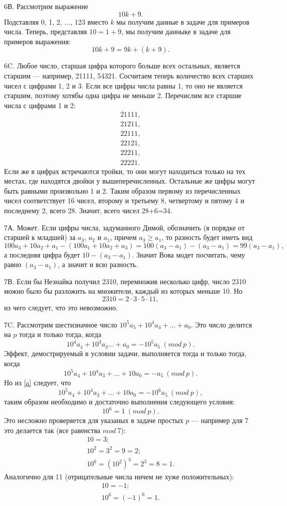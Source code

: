 \documentclass[12pt]{amsart}
\theoremstyle{definition}
\theoremstyle{remark}
\theoremstyle{plain}
\begin{document}
6В. Рассмотрим выражение
$$
10k+9.
$$
Подставляя 0, 1, 2, ..., 123 вместо $k$ мы получим данные в задаче для примеров числа. Теперь, представляя $10=1+9$, мы получим данныке в задаче для примеров выражения:
$$
10k+9=9k+(k+9).
$$

6C. Любое число, старшая цифра которого больше всех остальных, является старшим --- например, 21111, 54321. Сосчитаем теперь количество всех старших чисел с цифрами 1, 2 и 3. Если все цифры числа равны 1, то оно не является старшим, поэтому хотябы одна цифра не меньше 2. Перечислим все старшие числа с цифрами 1 и 2:
$$\begin{array}{l}
21111,\\
21211,\\
22111,\\
22121,\\
22211,\\
22221.
\end{array}
$$
Если же в цифрах встречаются тройки, то они могут находиться только на тех местах, где находятся двойки у вышеперечисленных. Остальные же цифры могут быть равными произвольно 1 и 2. Таким образом первому из перечисленных чисел соответствует 16 чисел, второму и третьему 8, четвертому и пятому 4 и последнему 2, всего 28. Значит, всего чисел 28+6=34.

7А. Может. Если цифры числа, задуманного Димой, обозначить (в порядке от старшей к младшей) за $a_3$, $a_2$ и $a_1$, причем $a_3\geq a_1$, то разность будет иметь вид
$$
100a_3+10a_2+a_1-(100a_1+10a_2+a_3)=100(a_3-a_1)-(a_3-a_1)=99(a_3-a_1),
$$
а последняя цифра будет $10-(a_3-a_1)$. Значит Вова модет посчитать, чему равно $(a_3-a_1)$, а значит и всю разность.

7В. Если бы Незнайка получил 2310, перемножив несколько цифр, число 2310 можно было бы разложить на множители, каждый из которых меньше 10. Но
$$
2310=2\cdot 3\cdot5\cdot 11,
$$
из чего следует, что это невозможно.

7C. Рассмотрим шестизначное число $10^5a_5+10^4a_4+...+a_0$. Это число делится на $p$ тогда и только тогда, когда
\begin{equation}
\label{a} 10^4a_4+10^3a_3...+a_0=-10^5a_5\ (mod\ p).
\end{equation}
Эффект, демострируемый в условии задачи, выполняется тогда и только тогда, когда
$$
10^5a_4+10^4a_3+...+10a_0=-a_5\ (mod\ p).
$$
Но из \ref{a} следует, что
$$
10^5a_4+10^4a_3+...+10a_0=-10^6a_5\ (mod\ p),
$$
таким образом необходимо и достаточно выполнения следующего условия:
$$
10^6=1\ (mod\ p).
$$
Это несложно проверяется для указаных в задаче простых $p$ --- например для $7$ это делается так (все равенства $mod\ 7$):
$$
\begin{array}{l}
10=3;\\
10^2=3^2=9=2;\\
10^6=(10^2)^3=2^3=8=1.
\end{array}
$$
Аналогично для 11 (отрицательные числа ничем не хуже положительных):
$$\begin{array}{l}
10=-1;\\
10^6=(-1)^6=1.
\end{array}
$$
\end{document}

